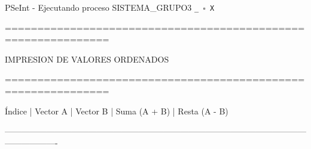 \documentclass[12pt,a4paper]{article}
\newcommand{\consola}[1]{\noindent\textcolor{pseString}{#1}}
\newenvironment{PSeIntWindow}{%
	\begin{tcolorbox}[
		breakable,
		enhanced,
		colback=white,
		colframe=black!60,
		boxrule=0.5pt,
		arc=1mm,
		left=0mm,
		right=0mm,
		top=0mm,
		bottom=2mm,
		width=\textwidth
		]
	}{%
	\end{tcolorbox}
}
\newcommand{\BarraPSeInt}{%
	\colorbox{gray!20}{%
		\parbox{\dimexpr\textwidth-2\fboxsep\relax}{%
			\small
			\textcolor{pseString}{\faPlayCircle}
			\hspace{0.3em}
			PSeInt - Ejecutando proceso SISTEMA\_GRUPO3
			\hfill
			\texttt{\_ \hspace{0.5em} \(\square\) \hspace{0.5em} X}
		}
	}
}
\begin{document}
\begin{PSeIntWindow}
	
	\BarraPSeInt
	
	\vspace{0.2cm}
	
	\ttfamily\small
	
	\consola{==============================================================}\par
	
	\begin{center}
		\textcolor{pseString}{IMPRESION DE VALORES ORDENADOS}
	\end{center}
	
	\consola{==============================================================}\par
	
	\vspace{0.25cm}
	
	\consola{Índice \hspace{0.2cm}| \hspace{0.2cm} Vector A \hspace{0.2cm}| \hspace{0.2cm} Vector B \hspace{0.2cm}| \hspace{0.2cm} Suma (A + B) \hspace{0.2cm}| \hspace{0.2cm} Resta (A - B)}\par
	\consola{-------------------------------------------------------------------------------------------------------------------------------}\par
	

\end{PSeIntWindow}
\end{document}
